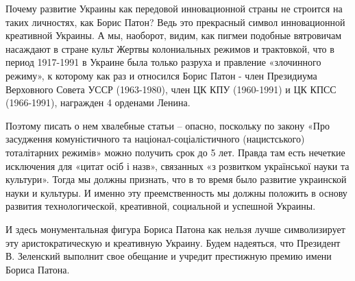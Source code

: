 
Почему развитие Украины как передовой инновационной страны не строится на таких
личностях, как Борис Патон? Ведь это прекрасный символ инновационной креативной
Украины. А мы, наоборот, видим, как пигмеи подобные вятровичам насаждают в
стране культ Жертвы колониальных режимов и трактовкой, что в период 1917-1991 в
Украине была только разруха и правление «злочинного режиму», к которому как раз
и относился Борис Патон - член Президиума Верховного Совета УССР (1963-1980),
член ЦК КПУ (1960-1991) и ЦК КПСС (1966-1991), награжден 4 орденами Ленина.


Поэтому писать о нем хвалебные статьи – опасно, поскольку по закону «Про
засудження комуністичного та націонал-соціалістичного (нацистського)
тоталітарних режимів» можно получить срок до 5 лет. Правда там есть нечеткие
исключения для «цитат осіб і назв», связанных «з розвитком української науки та
культури». Тогда мы должны признать, что в то время было развитие украинской
науки и культуры. И именно эту преемственность мы должны положить в основу
развития технологической, креативной, социальной и успешной Украины.


И здесь монументальная фигура Бориса Патона как нельзя лучше символизирует эту
аристократическую и креативную Украину. Будем надеяться, что Президент В.
Зеленский выполнит свое обещание и учредит престижную премию имени Бориса
Патона.

